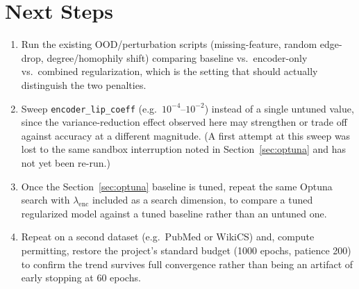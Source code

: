 \documentclass{article}
\begin{document}
\section{Next Steps}

\begin{enumerate}
  \item Run the existing OOD/perturbation scripts (missing-feature,
        random edge-drop, degree/homophily shift) comparing baseline vs.\
        encoder-only vs.\ combined regularization, which is the setting
        that should actually distinguish the two penalties.
  \item Sweep \texttt{encoder\_lip\_coeff} (e.g.\ $10^{-4}$--$10^{-2}$)
        instead of a single untuned value, since the variance-reduction
        effect observed here may strengthen or trade off against accuracy
        at a different magnitude. (A first attempt at this sweep was lost
        to the same sandbox interruption noted in
        Section~\ref{sec:optuna} and has not yet been re-run.)
  \item Once the Section~\ref{sec:optuna} baseline is tuned, repeat the
        same Optuna search with $\lambda_{\text{enc}}$ included as a
        search dimension, to compare a tuned regularized model against a
        tuned baseline rather than an untuned one.
  \item Repeat on a second dataset (e.g.\ PubMed or WikiCS) and, compute
        permitting, restore the project's standard budget (1000 epochs,
        patience 200) to confirm the trend survives full convergence
        rather than being an artifact of early stopping at 60 epochs.
\end{enumerate}
\end{document}
